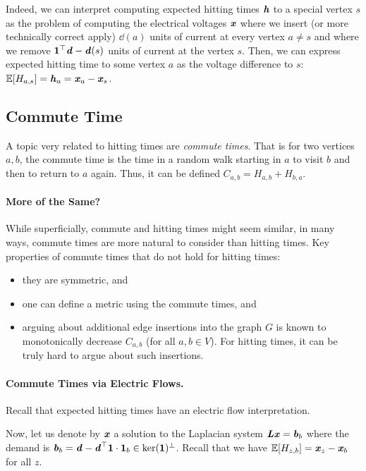 Indeed, we can interpret computing expected hitting times ${\boldsymbol{\mathit{h}}}$ to a special vertex $s$ as the problem of computing the electrical voltages $\boldsymbol{\mathit{x}}$ where we insert (or more technically correct apply) $\dd(a)$ units of current at every vertex $a \neq s$ and where we remove $\boldsymbol{1}^\top\boldsymbol{\mathit{d}} - \boldsymbol{\mathit{d}}(s)$ units of current at the vertex $s$. Then, we can express expected hitting time to some vertex $a$ as the voltage difference to $s$: $\mathbb{E}[H_{a,s}] = {\boldsymbol{\mathit{h}}}_a = \boldsymbol{\mathit{x}}_a - \boldsymbol{\mathit{x}}_s$.

\subsection{Commute Time}

A topic very related to hitting times are \emph{commute times}. That is for two vertices $a,b$, the commute time is the time in a random walk starting in $a$ to visit $b$ and then to return to $a$ again. Thus, it can be defined $C_{a,b} = H_{a,b} + H_{b,a}$.

\paragraph{More of the Same?} While superficially, commute and hitting times might seem similar, in many ways, commute times are more natural to consider than hitting times. Key properties of commute times that do not hold for hitting times:
\begin{itemize}
	\item they are symmetric, and
	\item one can define a metric using the commute times, and
	\item arguing about additional edge insertions into the graph $G$ is known to monotonically decrease $C_{a,b}$ (for all $a,b \in V$). For hitting times, it can be truly hard to argue about such insertions.
\end{itemize}

\paragraph{Commute Times via Electric Flows.} Recall that expected hitting times have an electric flow interpretation. 

Now, let us denote by $\boldsymbol{\mathit{x}}$ a solution to the Laplacian system $\boldsymbol{\mathit{L}} \boldsymbol{\mathit{x}} = \boldsymbol{\mathit{b}}_b$ where the demand is $\boldsymbol{\mathit{b}}_b = \boldsymbol{\mathit{d}} - \boldsymbol{\mathit{d}}^\top \boldsymbol{1} \cdot \boldsymbol{1}_b \in \ker(\boldsymbol{1})^\perp$. Recall that we have $\mathbb{E}[H_{z,b}] = \boldsymbol{\mathit{x}}_z - \boldsymbol{\mathit{x}}_b$ for all $z$. 


